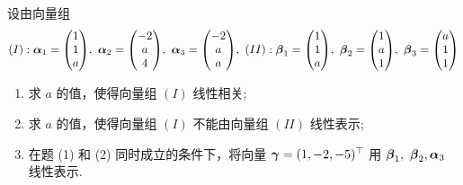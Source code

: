 \begin{example}[2016 南京航空航天大学]
    设由向量组 $$(I):\vb*{\alpha}_1=\mqty(1\\1\\a),~\vb*{\alpha}_2=\mqty(-2\\a\\4),~\vb*{\alpha}_3=\mqty(-2\\a\\a),~(II):\vb*{\beta}_1=\mqty(1\\1\\a),~\vb*{\beta}_2=\mqty(1\\a\\1),~\vb*{\beta}_3=\mqty(a\\1\\1)$$
    \begin{enumerate}[label=(\arabic{*})]
        \item 求 $a$ 的值，使得向量组 $(I)$ 线性相关;
        \item 求 $a$ 的值，使得向量组 $(I)$ 不能由向量组 $(II)$ 线性表示;
        \item 在题 (1) 和 (2) 同时成立的条件下，将向量 $\vb*{\gamma}=(1,-2,-5)^\top$ 用 $\vb*{\beta}_1,~\vb*{\beta}_2,\vb*{\alpha}_3$ 线性表示.
    \end{enumerate}
\end{example}
